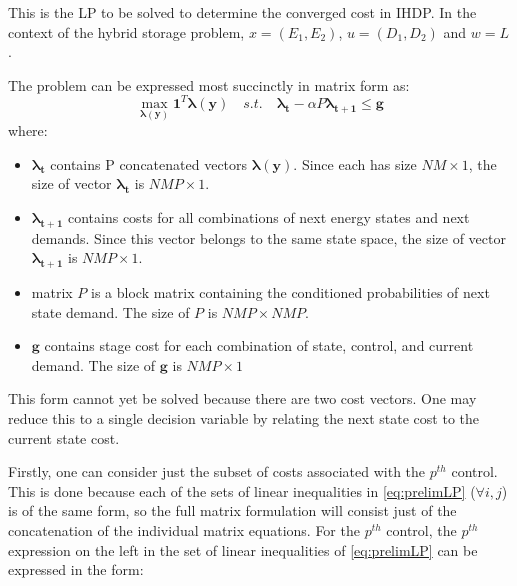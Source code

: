 \documentclass[conference]{IEEEtran}
\begin{document}
This is the LP to be solved to determine the converged cost in IHDP. In the context of the hybrid storage problem, $x=(E_{1},E_{2})$, $u=(D_{1},D_{2})$ and $w=L$.

The problem can be expressed most succinctly in matrix form as:
\begin{equation} \label{eq:prelimLPmtx}
    \max_{\boldsymbol{\lambda(y)}} \boldsymbol{1}^{T} \boldsymbol{\lambda(y)}
    \hspace{1em}s.t.\hspace{1em}
    \boldsymbol{\lambda_{t}}-\alpha P\boldsymbol{\lambda_{t+1}} \leq \boldsymbol{g}
\end{equation} where:

\begin{itemize}
	\item $\boldsymbol{\lambda_{t}}$ contains P concatenated vectors $\boldsymbol{\lambda(y)}$. Since each has size $NM\times 1$, the size of vector $\boldsymbol{\lambda_{t}}$ is $NMP\times 1$.
	
	\item $\boldsymbol{\lambda_{t+1}}$ contains costs for all combinations of next energy states and next demands. Since this vector belongs to the same state space, the size of vector $\boldsymbol{\lambda_{t+1}}$ is $NMP\times 1$.
	
	\item matrix $P$ is a block  matrix containing the conditioned probabilities of next state demand. The size of $P$ is $NMP\times NMP$.
	
	\item $\boldsymbol{g}$ contains stage cost for each combination of state, control, and current demand. The size of $\boldsymbol{g}$ is $NMP\times 1$
	
\end{itemize}

This form cannot yet be solved because there are two cost vectors. One may reduce this to a single decision variable by relating the next state cost to the current state cost.

Firstly, one can consider just the subset of costs associated with the $p^{th}$ control. This is done because each of the sets of linear inequalities in \eqref{eq:prelimLP} ($\forall i,j$) is of the same form, so the full matrix formulation will consist just of the concatenation of the individual matrix equations. For the $p^{th}$ control, the $p^{th}$ expression on the left in the set of linear inequalities of \eqref{eq:prelimLP} can be expressed in the form:
\end{document}
